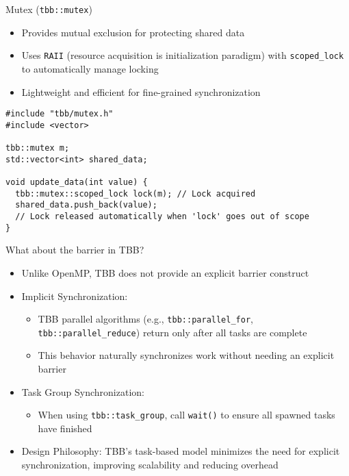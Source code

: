 \documentclass{beamer}
\begin{document}
\begin{frame}[fragile]{Mutex (\texttt{tbb::mutex})}
  \begin{itemize}
    \item Provides mutual exclusion for protecting shared data
    \item Uses \texttt{RAII} (resource acquisition is initialization paradigm) with \texttt{scoped\_lock} to automatically manage locking
    \item Lightweight and efficient for fine-grained synchronization
  \end{itemize}

  \vspace{0.5em}

  \lstset{style=CStyle}
  \begin{lstlisting}
#include "tbb/mutex.h"
#include <vector>

tbb::mutex m;
std::vector<int> shared_data;

void update_data(int value) {
  tbb::mutex::scoped_lock lock(m); // Lock acquired
  shared_data.push_back(value);
  // Lock released automatically when 'lock' goes out of scope
}
  \end{lstlisting}
\end{frame}

\begin{frame}{What about the barrier in TBB?}
  \begin{itemize}
    \item Unlike OpenMP, TBB does not provide an explicit barrier construct
    \item Implicit Synchronization:
      \begin{itemize}
        \item TBB parallel algorithms (e.g., \texttt{tbb::parallel\_for}, \texttt{tbb::parallel\_reduce}) return only after all tasks are complete
        \item This behavior naturally synchronizes work without needing an explicit barrier
      \end{itemize}
    \item Task Group Synchronization:
      \begin{itemize}
        \item When using \texttt{tbb::task\_group}, call \texttt{wait()} to ensure all spawned tasks have finished
      \end{itemize}
    \item Design Philosophy: TBB's task-based model minimizes the need for explicit synchronization, improving scalability and reducing overhead
  \end{itemize}
\end{frame}
\end{document}
